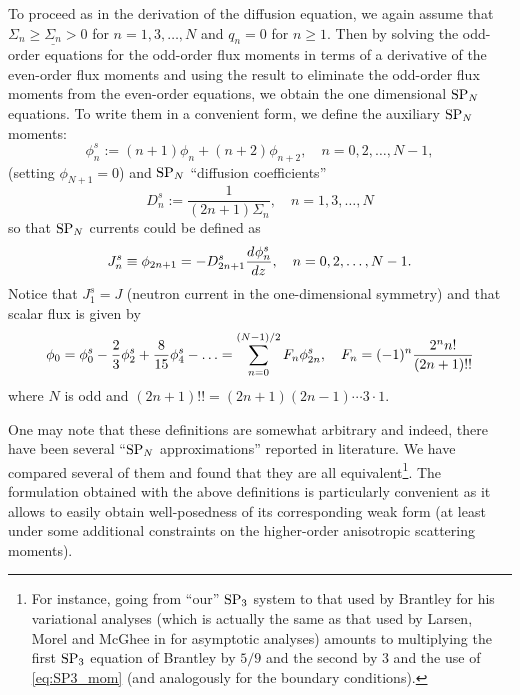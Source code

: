 To proceed as in the derivation of the diffusion equation, we again assume that $\Sigma_n \geq \underline{\Sigma_n} > 0$
for $n = 1,3,\ldots,N$ and $q_n = 0$ for $n \geq 1$. Then by solving the
odd-order equations for the odd-order flux moments in terms of a derivative of the even-order flux moments and using the
result to eliminate the odd-order flux moments from the even-order equations, we obtain the one dimensional $\SPN$ 
equations. To write them in a convenient form, we define the auxiliary $\SPN$ moments:
\begin{equation}\label{eq:SP3_mom}
	\phi^s_n := (n+1) \phi _{n}+(n+2) \phi _{n+2},\quad n = 0,2,\ldots,N-1,
\end{equation}
(setting $\phi_{N+1} = 0$)
and $\SPN$ ``diffusion coefficients''
\begin{equation}\label{eq:SP3_dif}
	D^s_n := \frac{1}{(2 n+1) \Sigma _{n}},\quad n = 1,3,\ldots,N
\end{equation}
so that $\SPN$ currents could be defined as
\begin{equation}\label{eq:spncur}
	J^s_n \equiv \phi_{2n+1} = -D^s_{2n+1}\der{\phi^s_n}{z}, \quad n = 0,2,\ldots,N-1.
\end{equation}
Notice that $J^s_1 = J$ (neutron current in the one-dimensional symmetry) and that scalar flux is given by
\begin{equation}\label{eq:SPN_scalar_flux}
	\phi_0 = \phi^s_0 - {\frac23}\phi^s_2 + {\frac{8}{15}}\phi^s_4 - \ldots = \suma[n]{0}{(N-1)/2}{F_{n}}\phi^s_{2n},\quad
	F_{n} = (-1)^n\frac{2^nn!}{(2n+1)\text{!!}}
\end{equation}
where $N$ is odd and
$(2n+1)!! = (2n+1)(2n-1)\cdots 3\cdot 1$.

One may note that these definitions are somewhat arbitrary and indeed, there have been several ``$\SPN$ approximations''
reported in literature. We have compared several of them and found that they are all equivalent\footnote{For instance,
going from ``our'' $\SPN[3]$ system to that used by Brantley \cite{Brantley1} for his variational analyses (which is
actually the same as that used by Larsen, Morel and McGhee in \cite{Larsen1} for asymptotic analyses) amounts to multiplying the
first $\SPN[3]$ equation of Brantley by $5/9$ and the second by $3$ and the use of \eqref{eq:SP3_mom} (and
analogously for the boundary conditions).}.
The formulation obtained with the above definitions is particularly convenient as it allows to easily obtain 
well-posedness of its corresponding weak form (at least under some additional constraints on the higher-order
anisotropic scattering moments).


